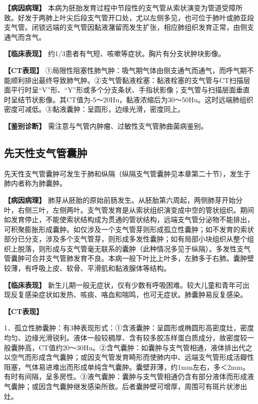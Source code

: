 \textbf{【病因病理】}
本病为胚胎发育过程中节段性的支气管从索状演变为管道受障所致。好发于两肺上叶尖后段支气管开口处，尤以左侧多见，也可位于肺叶或肺亚段支气管。闭锁远端的支气管因黏液潴留而发生扩张，相应肺组织发育正常，由侧支通气而含气。

\textbf{【临床表现】}
约1/3患者有气短、咳嗽等症状。胸片有分支状肿块影像。

\textbf{【CT表现】}
①局限性阻塞性肺气肿：吸气期气体由侧支通气而通气，而呼气期不能顺利排出最终导致肺气肿。②支气管黏液栓塞：黏液栓塞的支气管与CT扫描层面平行时呈“V”形、“Y”形或多个分支条状、手指状影像；支气管与扫描层面垂直时呈结节状影像。其CT值为-5～20Hu，黏液浓缩后为30～50Hu。这时远端肺组织密度可减低。③黏液囊肿：呈圆形，边缘光滑，密度同上。

\textbf{【鉴别诊断】} 需注意与气管内肿瘤、过敏性支气管肺曲菌病鉴别。

\subsection{先天性支气管囊肿}

先天性支气管囊肿可发生于肺和纵隔（纵隔支气管囊肿见本章第二十节），发生于肺内者称为肺囊肿。

\textbf{【病因病理】}
肺芽从胚胎的原始前肠发生。从胚胎第六周起，两侧肺芽开始分叶，右侧三叶，左侧两叶。支气管发育是从索状组织演变成中空的管状组织。期间如发育停止，不能使索状结构成为贯通的管状结构，远端支气管分泌物不能排出，可积聚膨胀形成囊肿。如仅涉及一个支气管芽则形成孤立性囊肿；如不发育的索状部分已分支，涉及多个支气管芽，则形成多发性囊肿；如有局部小块组织从整个组织上脱落，则形成与支气管毫无联系的囊肿（此种情况多见于纵隔）。多发性支气管囊肿可合并支气管肺发育不良。本病一般下叶比上叶多，左肺多于右肺。囊肿壁较薄，有呼吸上皮、软骨、平滑肌和黏液腺体等结构。

\textbf{【临床表现】}
新生儿期一般无症状，仅有少数有呼吸困难。较大儿童和青年可出现反复感染症状如发热、咳痰、咯血和喘鸣，也可无症状。肺囊肿易反复感染。

\textbf{【CT表现】}

1．孤立性肺囊肿：有3种表现形式：①含液囊肿：呈圆形或椭圆形高密度灶，密度均匀、边缘光滑锐利。液体一般较稠厚、含有较多胶冻样蛋白质成分，故密度较一般囊肿高，CT值约20～30Hu。②含气囊肿：如囊肿与支气管相通，液体排出代之以空气而形成含气囊肿；或因支气管发育畸形而使肺内中、远端支气管形成活瓣性阻塞，气体易进难出而形成单纯含气囊肿。囊壁菲薄，约1mm左右，多＜2mm。有时有间隔，呈多房性。③液气囊肿：囊肿与支气管相通仍含有部分液体而形成液气囊肿；或因含气囊肿继发感染所致。后者囊肿壁可增厚，周围可有斑片状渗出灶。

